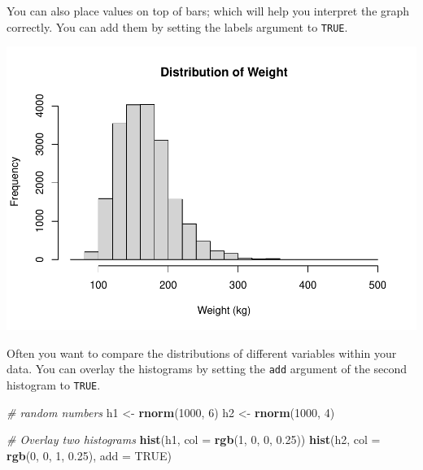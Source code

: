\documentclass[
]{book}
\newenvironment{Shaded}{\begin{snugshade}}{\end{snugshade}}
\newcommand{\CommentTok}[1]{\textcolor[rgb]{0.56,0.35,0.01}{\textit{#1}}}
\newcommand{\DataTypeTok}[1]{\textcolor[rgb]{0.13,0.29,0.53}{#1}}
\newcommand{\DecValTok}[1]{\textcolor[rgb]{0.00,0.00,0.81}{#1}}
\newcommand{\FloatTok}[1]{\textcolor[rgb]{0.00,0.00,0.81}{#1}}
\newcommand{\KeywordTok}[1]{\textcolor[rgb]{0.13,0.29,0.53}{\textbf{#1}}}
\newcommand{\NormalTok}[1]{#1}
\newcommand{\OperatorTok}[1]{\textcolor[rgb]{0.81,0.36,0.00}{\textbf{#1}}}
\newcommand{\OtherTok}[1]{\textcolor[rgb]{0.56,0.35,0.01}{#1}}
\newcommand{\StringTok}[1]{\textcolor[rgb]{0.31,0.60,0.02}{#1}}
\begin{document}
You can also place values on top of bars; which will help you interpret the graph correctly. You can add them by setting the labels argument to \texttt{TRUE}.

\begin{Shaded}
\end{Shaded}

\includegraphics{_main_files/figure-latex/unnamed-chunk-171-1.pdf}

Often you want to compare the distributions of different variables within your data. You can overlay the histograms by setting the \texttt{add} argument of the second histogram to \texttt{TRUE}.

\begin{Shaded}
\begin{Highlighting}[]
\CommentTok{# random numbers}
\NormalTok{h1 <-}\StringTok{ }\KeywordTok{rnorm}\NormalTok{(}\DecValTok{1000}\NormalTok{, }\DecValTok{6}\NormalTok{)}
\NormalTok{h2 <-}\StringTok{ }\KeywordTok{rnorm}\NormalTok{(}\DecValTok{1000}\NormalTok{, }\DecValTok{4}\NormalTok{)}

\CommentTok{# Overlay two histograms}
\KeywordTok{hist}\NormalTok{(h1, }\DataTypeTok{col =} \KeywordTok{rgb}\NormalTok{(}\DecValTok{1}\NormalTok{, }\DecValTok{0}\NormalTok{, }\DecValTok{0}\NormalTok{, }\FloatTok{0.25}\NormalTok{))}
\KeywordTok{hist}\NormalTok{(h2, }\DataTypeTok{col =} \KeywordTok{rgb}\NormalTok{(}\DecValTok{0}\NormalTok{, }\DecValTok{0}\NormalTok{, }\DecValTok{1}\NormalTok{, }\FloatTok{0.25}\NormalTok{), }\DataTypeTok{add =} \OtherTok{TRUE}\NormalTok{)}
\end{Highlighting}
\end{Shaded}
\end{document}
